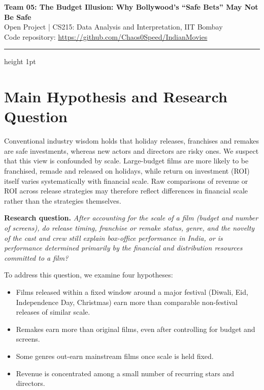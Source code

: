 \documentclass[11pt,a4paper]{article}
\begin{document}
\begin{center}
  {\LARGE\bfseries\color{black} Team 05: The Budget Illusion: Why Bollywood’s “Safe Bets” May Not Be Safe}\\[3pt]
  {\small Open Project \;|\; CS215: Data Analysis and Interpretation, IIT Bombay\\
  Code repository: \url{https://github.com/Chaos0Speed/IndianMovies}}
\end{center}
\vspace{-8pt}
{\color{accent}\hrule height 1pt}

\section{Main Hypothesis and Research Question}

Conventional industry wisdom holds that holiday releases, franchises and remakes are safe investments, whereas new actors and directors are risky ones. We suspect that this view is confounded by scale. Large-budget films are more likely to be franchised, remade and released on holidays, while return on investment (ROI) itself varies systematically with financial scale. Raw comparisons of revenue or ROI across release strategies may therefore reflect differences in financial scale rather than the strategies themselves.

\medskip
\textbf{Research question.} \emph{After accounting for the scale of a film (budget and number of screens), do release timing, franchise or remake status, genre, and the novelty of the cast and crew still explain box-office performance in India, or is performance determined primarily by the financial and distribution resources committed to a film?}

\medskip
To address this question, we examine four hypotheses:
\begin{itemize}
  \item[\textbf{H1.}] Films released within a fixed window around a major festival (Diwali, Eid, Independence Day, Christmas) earn more than comparable non-festival releases of similar scale.
  \item[\textbf{H2.}] Remakes earn more than original films, even after controlling for budget and screens.
  \item[\textbf{H3.}] Some genres out-earn mainstream films once scale is held fixed.
  \item[\textbf{H4.}] Revenue is concentrated among a small number of recurring stars and directors.
\end{itemize}
\end{document}
